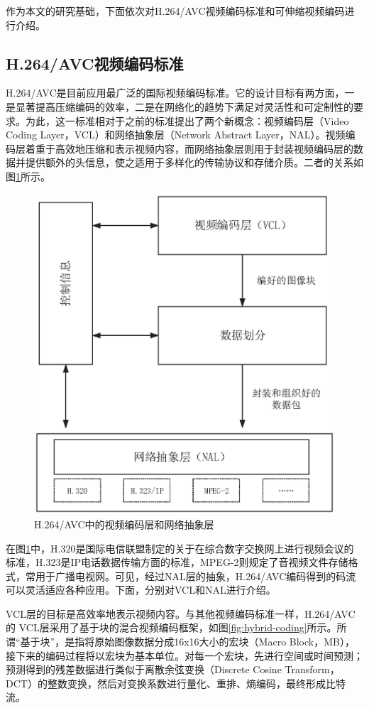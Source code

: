 作为本文的研究基础，下面依次对H.264/AVC视频编码标准和可伸缩视频编码进行介绍。

\subsection{H.264/AVC视频编码标准}

H.264/AVC是目前应用最广泛的国际视频编码标准。它的设计目标有两方面，一是显著提高压缩编码的效率，二是在网络化的趋势下满足对灵活性和可定制性的要求。为此，这一标准相对于之前的标准提出了两个新概念：视频编码层（Video Coding Layer，VCL）和网络抽象层（Network Abstract Layer，NAL）。视频编码层着重于高效地压缩和表示视频内容，而网络抽象层则用于封装视频编码层的数据并提供额外的头信息，使之适用于多样化的传输协议和存储介质。二者的关系如图\ref{fig:AVC-design}所示。

\begin{figure}[h]
	\centering
	\includegraphics[width = 0.8\linewidth]{eps/AVC-design}
	\caption{H.264/AVC中的视频编码层和网络抽象层\label{fig:AVC-design}}
\end{figure}

在图\ref{fig:AVC-design}中，H.320是国际电信联盟制定的关于在综合数字交换网上进行视频会议的标准，H.323是IP电话数据传输方面的标准，MPEG-2则规定了音视频文件存储格式，常用于广播电视网。可见，经过NAL层的抽象，H.264/AVC编码得到的码流可以灵活适应各种应用。下面，分别对VCL和NAL进行介绍。

VCL层的目标是高效率地表示视频内容。与其他视频编码标准一样，H.264/AVC的
VCL层采用了基于块的混合视频编码框架，如图\ref{fig:hybrid-coding}\supercite{H.264-Overview}所示。所谓“基于块”，是指将原始图像数据分成16x16大小的宏块（Macro Block，MB），接下来的编码过程将以宏块为基本单位。对每一个宏块，先进行空间或时间预测；预测得到的残差数据进行类似于离散余弦变换（Discrete Cosine Transform，DCT）的整数变换，然后对变换系数进行量化、重排、熵编码，最终形成比特流。


